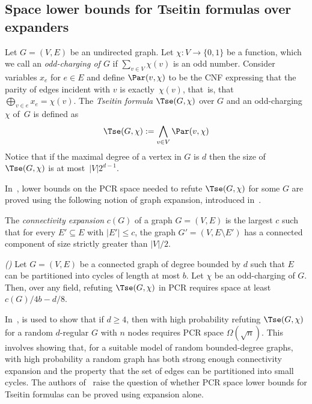 \subsection{Space lower bounds for Tseitin formulas over expanders}

Let $G = (V, E)$ be an undirected graph.
Let $\chi: V \rightarrow \{0, 1\}$ be a function, which we call an \emph{odd-charging
of $G$}  if $\sum_{v\in V} \chi(v)$ is an odd number. Consider variables $x_e$ for $e\in E$ and define 
$\Par(v,\chi)$ to be the CNF 
expressing 
that the parity of edges incident with $v$ is exactly~$\chi(v)$, that~is, that ~$\bigoplus_{v \in e}x_e= \chi(v)$. 
The \emph{Tseitin formula} $\Tse(G,\chi)$ over $G$ and an odd-charging 
$\chi$ of~$G$ is defined as 
$$
\Tse(G,\chi) := \bigwedge_{v\in V} \Par(v,\chi)
$$
Notice that if the maximal degree of a vertex in $G$ is $d$ then the size of $\Tse(G,\chi)$ is at most~$|V|2^{d-1}$.

In~\cite{DBLP:conf/icalp/FilmusLMNV13}, lower bounds on the PCR space needed to refute 
$\Tse(G,\chi)$ for some $G$ are proved using the following notion of graph expansion, 
introduced in~\cite{ABRW}.


\begin{definition} 
The \emph{connectivity expansion} $c(G)$ of a graph $G = (V, E)$ is the largest $c$ such that for every $E' \subseteq E$ with $|E'|\leq c$, the graph
$G' = (V, E \setminus E')$ has a connected component of size strictly greater than $|V|/2$.
\end{definition}

\begin{theorem} \emph{(\cite{DBLP:conf/icalp/FilmusLMNV13})}\label{thm:c(G)-bound} 
Let $G = (V, E)$ be a connected graph of degree bounded by $d$  such that $E$ can be partitioned into cycles of length at
most $b$. Let $\chi$ be an odd-charging of $G$.
Then, over any field, refuting $\Tse(G, \chi)$ in PCR requires space 
at least ${c(G)}/{4b} - {d}/{8}$.
\end{theorem}


In~\cite{DBLP:conf/icalp/FilmusLMNV13},  is used to show that if $d \ge 4$,
then with high probability refuting $\Tse(G,\chi)$ for a random $d$-regular $G$ with $n$ nodes
requires PCR space $\Omega(\sqrt{n})$. This involves showing 
that, for a suitable model of random bounded-degree graphs,
with high probability a random graph has both strong enough connectivity expansion 
and the property that the set of edges can be partitioned into small cycles.
The authors of~\cite{DBLP:conf/icalp/FilmusLMNV13} raise the question of whether 
PCR space lower bounds for Tseitin formulas can be proved using expansion alone. 

